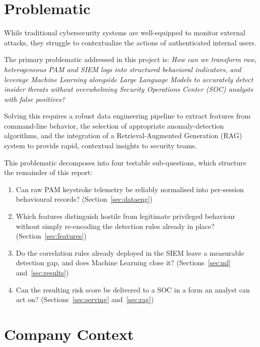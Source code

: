 \documentclass{classeENS}
\begin{document}
\section{Problematic}
While traditional cybersecurity systems are well-equipped to monitor external attacks, they struggle to contextualize the actions of authenticated internal users. %

The primary problematic addressed in this project is: \textit{How can we transform raw, heterogeneous PAM and SIEM logs into structured behavioral indicators, and leverage Machine Learning alongside Large Language Models to accurately detect insider threats without overwhelming Security Operations Center (SOC) analysts with false positives?} %

Solving this requires a robust data engineering pipeline to extract features from command-line behavior, the selection of appropriate anomaly-detection algorithms, and the integration of a Retrieval-Augmented Generation (RAG) system to provide rapid, contextual insights to security teams. %

This problematic decomposes into four testable sub-questions, which structure the remainder of this report:

\begin{enumerate}
    \item Can raw PAM keystroke telemetry be reliably normalised into per-session behavioural records? (Section~\ref{sec:dataeng})
    \item Which features distinguish hostile from legitimate privileged behaviour without simply re-encoding the detection rules already in place? (Section~\ref{sec:features})
    \item Do the correlation rules already deployed in the SIEM leave a measurable detection gap, and does Machine Learning close it? (Sections~\ref{sec:ml} and~\ref{sec:results})
    \item Can the resulting risk score be delivered to a SOC in a form an analyst can act on? (Sections~\ref{sec:serving} and~\ref{sec:rag})
\end{enumerate}

\section{Company Context}
\end{document}

